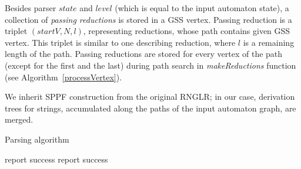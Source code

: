 Besides parser $state$ and $level$ (which is equal to the input automaton state), 
a collection of \emph{passing reductions} is stored in a GSS vertex. Passing reduction is a 
triplet $(startV, N, l)$, representing reductions, whose path contains given GSS vertex. 
This triplet is similar to one describing reduction, where $l$ is a remaining length of the path. 
Passing reductions are stored for every vertex of the path (except for the first and the last) 
during path search in \emph{makeReductions} function (see Algorithm~\ref{processVertex}).

We inherit SPPF construction from the original RNGLR; in our case, 
derivation trees for strings, accumulated along the paths of the input automaton 
graph, are merged. 

\begin{algorithm}[!ht]
\begin{algorithmic}[1]
\caption{Parsing algorithm}
\label{parsing}
     {report success}
    \EndIf
  \Else
    \EndWhile
     {report success}
    \EndIf
  \EndIf
\EndFunction
\end{algorithmic}
\end{algorithm}

